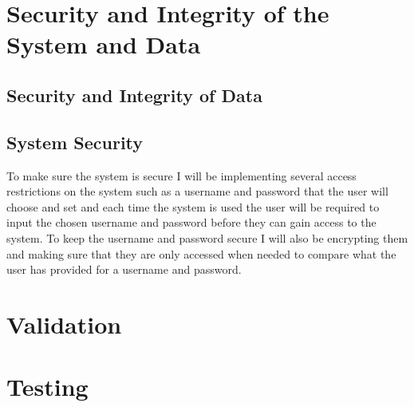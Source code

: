 \section{Security and Integrity of the System and Data}

\subsection{Security and Integrity of Data}

\subsection{System Security}
To make sure the system is secure I will be implementing several access restrictions on the system such as a username and password that the user will choose and  set and each time the system is used the user will be required to input the chosen username and password before they can gain access to the system. To keep the username and password secure I will also be encrypting them and making sure that they are only accessed when needed to compare what the user has provided for a username and password.
\section{Validation}

\section{Testing}

